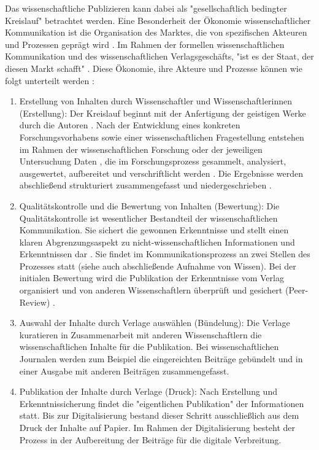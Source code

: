 Das wissenschaftliche Publizieren kann dabei als "gesellschaftlich bedingter Kreislauf" \cite{schirmbacher_2009_wisspub} betrachtet werden. Eine Besonderheit der Ökonomie wissenschaftlicher Kommunikation ist die Organisation des Marktes, die von spezifischen Akteuren und Prozessen geprägt wird \cite{Hess_2006}. Im Rahmen der formellen wissenschaftlichen Kommunikation und des wissenschaftlichen Verlagsgeschäfts, "ist es der Staat, der diesen Markt schafft" \cite{Hirschi_2015_buch_oa}. Diese Ökonomie, ihre Akteure und Prozesse können wie folgt unterteilt werden \cite{cite:11b} \cite{Hess_2006}:
\begin{enumerate}
\item Erstellung von Inhalten durch Wissenschaftler und Wissenschaftlerinnen (Erstellung): Der Kreislauf beginnt mit der Anfertigung der geistigen Werke durch die Autoren \cite{schirmbacher_2009_wisspub}. Nach der Entwicklung eines konkreten Forschungsvorhabens sowie einer wissenschaftlichen Fragestellung entstehen im Rahmen der wissenschaftlichen Forschung oder der jeweiligen Untersuchung Daten \cite{cite:11c}, die im Forschungsprozess gesammelt, analysiert, ausgewertet, aufbereitet und verschriftlicht werden \cite{cite:11d}. Die Ergebnisse werden abschließend strukturiert zusammengefasst und niedergeschrieben \cite{Hess_2006}.
\item Qualitätskontrolle und die Bewertung von Inhalten (Bewertung):
Die Qualitätskontrolle ist wesentlicher Bestandteil der wissenschaftlichen Kommunikation. Sie sichert die gewonnen Erkenntnisse \cite{cite:11e} und stellt einen klaren Abgrenzungsaspekt zu nicht-wissenschaftlichen Informationen und Erkenntnissen dar \cite{cite:11f}. Sie findet im Kommunikationsprozess an zwei Stellen des Prozesses statt (siehe auch abschließende Aufnahme von Wissen). Bei der initialen Bewertung wird die Publikation der Erkenntnisse vom Verlag organisiert \cite{schirmbacher_2009_wisspub} und von anderen Wissenschaftlern überprüft und gesichert (Peer-Review) \cite{Hess_2006}.
\item Auswahl der Inhalte durch Verlage auswählen (Bündelung):
Die Verlage kuratieren in Zusammenarbeit mit anderen Wissenschaftlern die wissenschaftlichen Inhalte für die Publikation. Bei wissenschaftlichen Journalen werden zum Beispiel die eingereichten Beiträge gebündelt und in einer Ausgabe mit anderen Beiträgen zusammengefasst.
\item Publikation der Inhalte durch Verlage (Druck):
Nach Erstellung und Erkenntnissicherung findet die "eigentlichen Publikation" \cite{schirmbacher_2009_wisspub} der Informationen statt. Bis zur Digitalisierung bestand dieser Schritt ausschließlich aus dem Druck der Inhalte auf Papier.\cite{cite:11h} Im Rahmen der Digitalisierung besteht der Prozess in der Aufbereitung der Beiträge für die digitale Verbreitung.

\end{enumerate}
